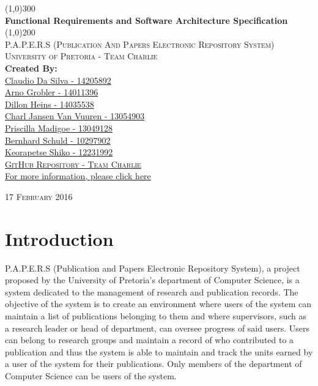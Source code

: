 \documentclass{article}
\begin{document}
	\begin{titlepage}
		\begin{center}
		
			\line(1,0){300}\\
			[6mm]
			\huge{
				\bfseries Functional Requirements and Software Architecture Specification
			}\\
			[2mm]
			\line(1,0){200}\\
			[15mm]
			\textsc{\large P.A.P.E.R.S (Publication And Papers Electronic Repository System)}\\
			[7.5mm]
			\textsc{\large University of Pretoria - Team Charlie}\\
			[20mm]
			\large{\textbf{Created By:}}\\
			[2mm]
			\large{
				\href{https://github.com/ClaudioMDS}{Claudio Da Silva - 14205892}\\
				\href{https://github.com/ArnoGrobler}{Arno Grobler - 14011396}\\
				\href{https://github.com/DillonHeins}{Dillon Heins - 14035538}\\
				\href{https://github.com/u13054903}{Charl Jansen Van Vuuren - 13054903}\\
				\href{https://github.com/pris264}{Priscilla Madigoe - 13049128}\\
				\href{https://github.com/BSchuld}{Bernhard Schuld - 10297902}\\
				\href{https://github.com/Keo11}{Keorapetse Shiko - 12231992}
			}\\
			[4cm]

		\href{https://github.com/DillonHeins/Charlie}{\textsc{\Large GitHub Repository - Team Charlie}\\[2mm]
		  For more information, please click here}
			
		\end{center}	
		\begin{flushright}
			\textsc{\large 17 February 2016}
		\end{flushright}
	\end{titlepage}
	
	\cleardoublepage
	\thispagestyle{empty}
	\tableofcontents
	\cleardoublepage
	\setcounter{page}{1}
	\section{Introduction}\label{sec:intro}
	P.A.P.E.R.S (Publication and Papers Electronic Repository System), a project proposed by the University of Pretoria's department of Computer Science, is a system dedicated to the management of research and publication records. The objective of the system is to create an environment where users of the system can maintain a list of publications belonging to them and where supervisors, such as a research leader or head of department, can oversee progress of said users. Users can belong to research groups and maintain a record of who contributed to a publication and thus the system is able to maintain and track the units earned by a user of the system for their publications. Only members of the department of Computer Science can be users of the system. 
	
\end{document}
